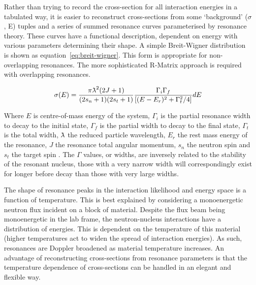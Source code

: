 Rather than trying to record the cross-section for all interaction energies in a tabulated way, it is easier to reconstruct cross-sections from some `background' ($\sigma$, E) tuples and a series of summed resonance curves parameterised by resonance theory. These curves have a functional description, dependent on energy with various parameters determining their shape. A simple Breit-Wigner distribution is shown as equation~\ref{eq:breit-wigner}. This form is appropriate for non-overlapping resonances. The more sophisticated R-Matrix approach is required with overlapping resonances. 

\begin{equation}
  \sigma(E) =  \frac{\pi\lambdabar^{2}(2J + 1)}{(2s_{n} + 1)(2s_{t} + 1)}  \frac{\Gamma_{i}\Gamma_{f}}{[(E-E_{r})^{2} + \Gamma^{2}_{t}/4]} dE
  \label{eq:breit-wigner}
\end{equation}

Where $E$ is centre-of-mass energy of the system, $\Gamma_{i}$ is the partial resonance width to decay to the initial state, $\Gamma_{f}$ is the partial width to decay to the final state, $\Gamma_{t}$ is the total width, $\lambdabar$ the reduced particle wavelength, $E_{r}$ the rest mass energy of the resonance, $J$ the resonance total angular momentum, $s_{n}$ the neutron spin and $s_{t}$ the target spin \cite{Libby2005}. The $\Gamma$ values, or widths, are inversely related to the stability of the resonant nucleus, those with a very narrow width will correspondingly exist for longer before decay than those with very large widths.

The shape of resonance peaks in the interaction likelihood and energy space is a function of temperature. This is best explained by considering a monoenergetic neutron flux incident on a block of material. Despite the flux beam being monoenergetic in the lab frame, the neutron-nucleus interactions have a distribution of energies. This is dependent on the temperature of this material (higher temperatures act to widen the spread of interaction energies). As such, resonances are Doppler broadened as material temperature increases. An advantage of reconstructing cross-sections from resonance parameters is that the temperature dependence of cross-sections can be handled in an elegant and flexible way. 

